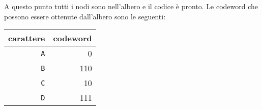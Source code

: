 A questo punto tutti i nodi sono nell'albero e il codice è pronto.
Le codeword che possono essere ottenute dall'albero sono le seguenti:
\begin{center}
\begin{tabular}{rr}
carattere & codeword \\
\hline
\texttt{A} & 0 \\
\texttt{B} & 110 \\
\texttt{C} & 10 \\
\texttt{D} & 111 \\
\end{tabular}
\end{center}